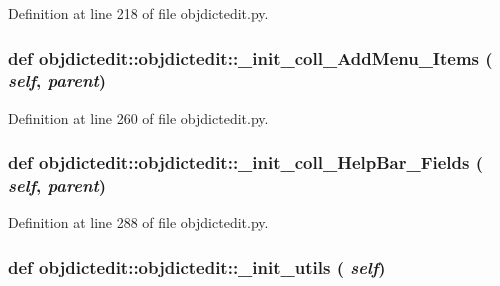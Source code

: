 Definition at line 218 of file objdictedit.py.\hypertarget{classobjdictedit_1_1objdictedit_08471670ebefa572813c703c693d367c}{
\subsubsection[\_\-init\_\-coll\_\-AddMenu\_\-Items]{\setlength{\rightskip}{0pt plus 5cm}def objdictedit::objdictedit::\_\-init\_\-coll\_\-Add\-Menu\_\-Items ( {\em self},  {\em parent})}}
\label{classobjdictedit_1_1objdictedit_08471670ebefa572813c703c693d367c}




Definition at line 260 of file objdictedit.py.\hypertarget{classobjdictedit_1_1objdictedit_31a6b686f4415521baeb49e911d05eed}{
\subsubsection[\_\-init\_\-coll\_\-HelpBar\_\-Fields]{\setlength{\rightskip}{0pt plus 5cm}def objdictedit::objdictedit::\_\-init\_\-coll\_\-Help\-Bar\_\-Fields ( {\em self},  {\em parent})}}
\label{classobjdictedit_1_1objdictedit_31a6b686f4415521baeb49e911d05eed}




Definition at line 288 of file objdictedit.py.\hypertarget{classobjdictedit_1_1objdictedit_a290085c41e1c25e1393e87d171b424e}{
\subsubsection[\_\-init\_\-utils]{\setlength{\rightskip}{0pt plus 5cm}def objdictedit::objdictedit::\_\-init\_\-utils ( {\em self})}}
\label{classobjdictedit_1_1objdictedit_a290085c41e1c25e1393e87d171b424e}





